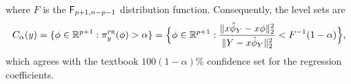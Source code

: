 \documentclass[12pt]{article}
\def\prob{\mathsf{P}}
\begin{document}
where $F$ is the ${\sf F}_{p+1, n-p-1}$ distribution function.  Consequently, the level sets are 
\[ C_\alpha(y) = \{ \phi \in \mathbb{R}^{p+1}: \pi_y^\text{\sc pr}(\phi) > \alpha\} = \Bigl\{ \phi \in \mathbb{R}^{p+1}: \frac{\|x\hat\phi_Y - x\phi\|_2^2}{\|Y - x\hat\phi_Y\|_2^2} < F^{-1}(1-\alpha) \Bigr\}, \]
which agrees with the textbook $100(1-\alpha)$\% confidence set for the regression coefficients.  
\end{document}

